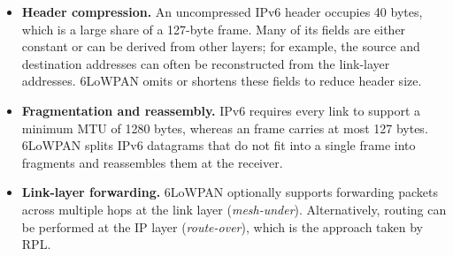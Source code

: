 \begin{itemize}
    \item \textbf{Header compression.} An uncompressed IPv6 header
        occupies 40 bytes, which is a large share of a 127-byte
        \ieeemac{} frame.
        Many of its fields are either constant or can be derived from
        other layers; for example, the source and destination addresses
        can often be reconstructed from the link-layer addresses. 6LoWPAN
        omits or shortens these fields to reduce header size.
    \item \textbf{Fragmentation and reassembly.} IPv6 requires every
        link to support a minimum MTU of 1280 bytes, whereas an
        \ieeemac{} frame carries at most 127 bytes. 6LoWPAN splits
        IPv6 datagrams that do not fit into a single frame into
        fragments and reassembles them at the receiver.
    \item \textbf{Link-layer forwarding.} 6LoWPAN optionally supports
        forwarding packets across multiple hops at the link layer
        (\emph{mesh-under}). Alternatively, routing can be performed at
        the IP layer (\emph{route-over}), which is the approach taken by
        RPL.
\end{itemize}
